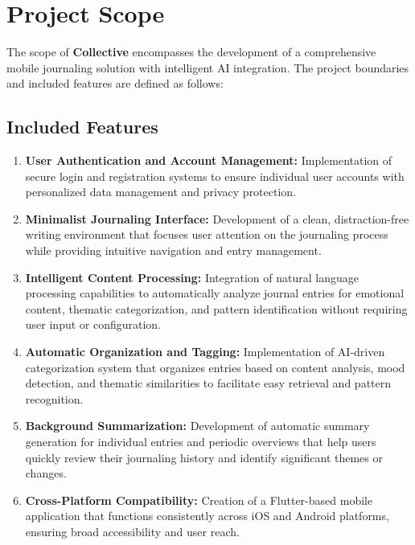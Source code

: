 \section{Project Scope}\label{sec:scope}

The scope of \textbf{Collective} encompasses the development of a comprehensive mobile journaling solution with intelligent AI integration. The project boundaries and included features are defined as follows:

\subsection{Included Features}\label{subsec:included-features}

\begin{enumerate}
	\item \textbf{User Authentication and Account Management:} Implementation of secure login and registration systems to ensure individual user accounts with personalized data management and privacy protection.
	
	\item \textbf{Minimalist Journaling Interface:} Development of a clean, distraction-free writing environment that focuses user attention on the journaling process while providing intuitive navigation and entry management.
	
	\item \textbf{Intelligent Content Processing:} Integration of natural language processing capabilities to automatically analyze journal entries for emotional content, thematic categorization, and pattern identification without requiring user input or configuration.
	
	\item \textbf{Automatic Organization and Tagging:} Implementation of AI-driven categorization system that organizes entries based on content analysis, mood detection, and thematic similarities to facilitate easy retrieval and pattern recognition.
	
	\item \textbf{Background Summarization:} Development of automatic summary generation for individual entries and periodic overviews that help users quickly review their journaling history and identify significant themes or changes.
	
	\item \textbf{Cross-Platform Compatibility:} Creation of a Flutter-based mobile application that functions consistently across iOS and Android platforms, ensuring broad accessibility and user reach.
	

\end{enumerate}
